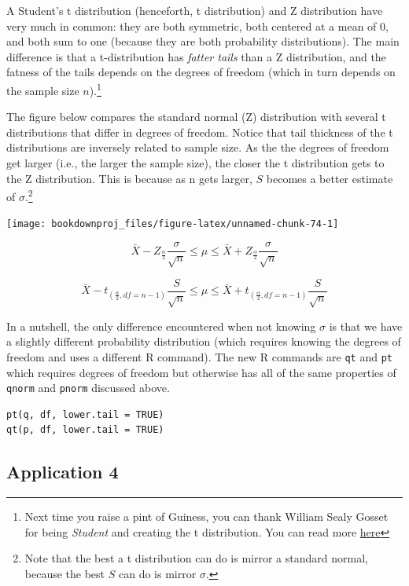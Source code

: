 \documentclass[
]{book}
\begin{document}
A Student's t distribution (henceforth, t distribution) and Z distribution have very much in common: they are both symmetric, both centered at a mean of 0, and both sum to one (because they are both probability distributions). The main difference is that a t-distribution has \emph{fatter tails} than a Z distribution, and the fatness of the tails depends on the degrees of freedom (which in turn depends on the sample size \(n\)).\footnote{Next time you raise a pint of Guiness, you can thank William Sealy Gosset for being \emph{Student} and creating the t distribution. You can read more \href{https://en.wikipedia.org/wiki/William_Sealy_Gosset}{here}}

The figure below compares the standard normal (Z) distribution with several t distributions that differ in degrees of freedom. Notice that tail thickness of the t distributions are inversely related to sample size. As the the degrees of freedom get larger (i.e., the larger the sample size), the closer the t distribution gets to the Z distribution. This is because as n gets larger, \(S\) becomes a better estimate of \(\sigma\).\footnote{Note that the best a t distribution can do is mirror a standard normal, because the best \(S\) can do is mirror \(\sigma\).}

\begin{center}\texttt{[image: bookdownproj\_files/figure-latex/unnamed-chunk-74-1]} \end{center}

\[\bar{X}-Z_{\frac{\alpha}{2}}\frac{\sigma}{\sqrt{n}} \leq \mu \leq \bar{X}+Z_{\frac{\alpha}{2}}\frac{\sigma}{\sqrt{n}}\]

\[\bar{X}-t_{(\frac{\alpha}{2},df=n-1)}\frac{S}{\sqrt{n}} \leq \mu \leq \bar{X}+t_{(\frac{\alpha}{2},df=n-1)}\frac{S}{\sqrt{n}}\]

In a nutshell, the only difference encountered when not knowing \(\sigma\) is that we have a slightly different probability distribution (which requires knowing the degrees of freedom and uses a different R command). The new R commands are \texttt{qt} and \texttt{pt} which requires degrees of freedom but otherwise has all of the same properties of \texttt{qnorm} and \texttt{pnorm} discussed above.

\begin{verbatim}
pt(q, df, lower.tail = TRUE)
qt(p, df, lower.tail = TRUE)
\end{verbatim}

\subsection{Application 4}\label{application-4}
\end{document}
